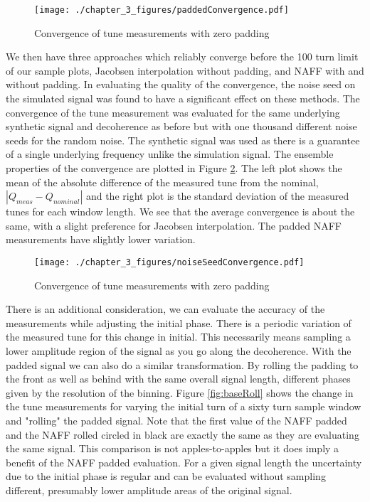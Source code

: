 \begin{figure}
	\centering
	\texttt{[image: ./chapter\_3\_figures/paddedConvergence.pdf]}
	\caption{Convergence of tune measurements with zero padding}
	\label{fig:padConv}
\end{figure}

We then have three approaches which reliably converge before the 100 turn limit of our sample plots, Jacobsen interpolation without padding, and NAFF with and without padding. In evaluating the quality of the convergence, the noise seed on the simulated signal was found to have a significant effect on these methods. The convergence of the tune measurement was evaluated for the same underlying synthetic signal and decoherence as before but with one thousand different noise seeds for the random noise. The synthetic signal was used as there is a guarantee of a single underlying frequency unlike the simulation signal. The ensemble properties of the convergence are plotted in Figure \ref{fig:noiseConv}. The left plot shows the mean of the absolute difference of the measured tune from the nominal, $|Q_{meas} - Q_{nominal}|$ and the right plot is the standard deviation of the measured tunes for each window length. We see that the average convergence is about the same, with a slight preference for Jacobsen interpolation. The padded NAFF measurements have slightly lower variation.


\begin{figure}
	\centering
	\texttt{[image: ./chapter\_3\_figures/noiseSeedConvergence.pdf]}
	\caption{Convergence of tune measurements with zero padding}
	\label{fig:noiseConv}
\end{figure}

There is an additional consideration, we can evaluate the accuracy of the measurements while adjusting the initial phase. There is a periodic variation of the measured tune for this change in initial.  This necessarily means sampling a lower amplitude region of the signal as you go along the decoherence. With the padded signal we can also do a similar transformation. By rolling the padding to the front as well as behind with the same overall signal length, different phases given by the resolution of the binning. Figure \ref{fig:baseRoll} shows the change in the tune measurements for varying the initial turn of a sixty turn sample window and "rolling" the padded signal. Note that the first value of the NAFF padded and the NAFF rolled circled in black are exactly the same as they are evaluating the same signal. This comparison is not apples-to-apples but it does imply a benefit of the NAFF padded evaluation. For a given signal length the uncertainty due to the initial phase is regular and can be evaluated without sampling different, presumably lower amplitude areas of the original signal.

